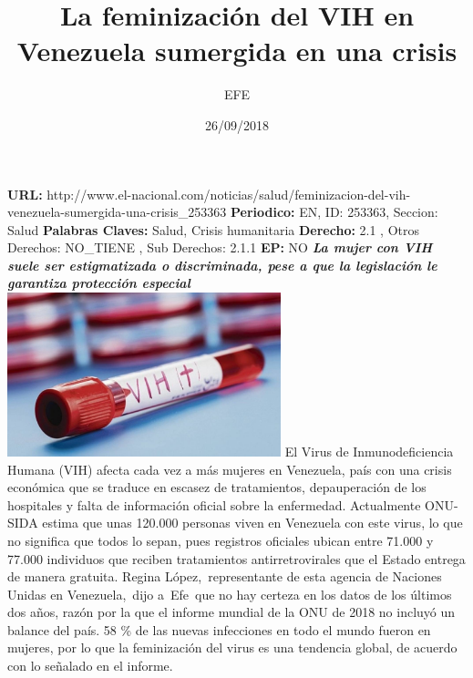 \documentclass{article}%
\title{\textbf{La feminización del VIH en Venezuela sumergida en una crisis}}%
\author{EFE}%
\date{26/09/2018}%
\begin{document}
%
\normalsize%
\maketitle%
\textbf{URL: }%
http://www.el{-}nacional.com/noticias/salud/feminizacion{-}del{-}vih{-}venezuela{-}sumergida{-}una{-}crisis\_253363\newline%
%
\textbf{Periodico: }%
EN, %
ID: %
253363, %
Seccion: %
Salud\newline%
%
\textbf{Palabras Claves: }%
Salud, Crisis humanitaria\newline%
%
\textbf{Derecho: }%
2.1%
, Otros Derechos: %
NO\_TIENE%
, Sub Derechos: %
2.1.1%
\newline%
%
\textbf{EP: }%
NO\newline%
\newline%
%
\textbf{\textit{La mujer con VIH suele ser estigmatizada o discriminada, pese a que la legislación le garantiza protección especial}}%
\newline%
\newline%
%
\includegraphics[width=300px]{93.jpg}%
\newline%
%
El Virus de Inmunodeficiencia Humana (VIH) afecta cada vez a más mujeres en Venezuela, país con una crisis económica que se traduce en escasez de tratamientos, depauperación de los hospitales y falta de información oficial sobre la enfermedad.%
\newline%
%
Actualmente ONU{-}SIDA estima que unas 120.000 personas viven en Venezuela con este virus, lo que no significa que todos lo sepan, pues registros oficiales ubican entre 71.000 y 77.000 individuos que reciben tratamientos antirretrovirales que el Estado entrega de manera gratuita.%
\newline%
%
Regina López,~representante de esta agencia de Naciones Unidas en Venezuela,~dijo a~Efe~que no hay certeza en los datos de los últimos dos años, razón por la que el informe mundial de la ONU de 2018 no incluyó un balance del país.%
\newline%
%
58 \% de las nuevas infecciones en todo el mundo fueron en mujeres, por lo que la feminización del virus es una tendencia global, de acuerdo con lo señalado en el informe.%
\end{document}
